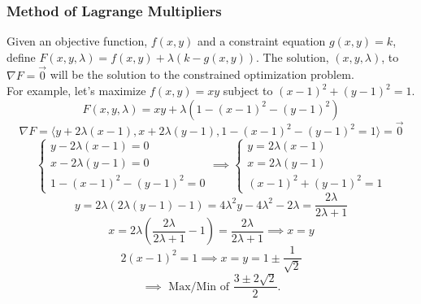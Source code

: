 \subsubsection{Method of Lagrange Multipliers}
\noindent
Given an objective function, $f(x,y)$ and a constraint equation $g(x,y) = k$, define $F(x,y,\lambda) = f(x,y) + \lambda(k-g(x,y))$.
The solution, $(x, y, \lambda)$, to $\nabla F = \vec{0}$ will be the solution to the constrained optimization problem.\\

\noindent
For example, let's maximize $f(x,y)=xy$ subject to $(x-1)^2 + (y-1)^2 = 1$.
\begin{equation*}
	F(x,y,\lambda) = xy + \lambda(1 - (x-1)^2 - (y-1)^2)
\end{equation*}
\begin{equation*}
	\nabla F = \langle y + 2\lambda(x-1), x+2\lambda(y-1), 1 - (x-1)^2 - (y-1)^2 = 1 \rangle = \vec{0}
\end{equation*}
\begin{equation*}
	\begin{cases}
		y - 2\lambda(x-1) = 0 \\ 
		x - 2\lambda(y-1) = 0 \\ 
		1 - (x-1)^2 - (y-1)^2 = 0
	\end{cases}
	\implies \begin{cases}
		y = 2\lambda(x-1) \\ 
		x = 2\lambda(y-1) \\ 
		(x-1)^2 + (y-1)^2 = 1
	\end{cases}
\end{equation*}
\begin{equation*}
	y = 2\lambda(2\lambda(y-1) - 1) = 4\lambda^2 y - 4\lambda^2 - 2\lambda = \frac{2\lambda}{2\lambda+1}
\end{equation*}
\begin{equation*}
	x = 2\lambda\left(\frac{2\lambda}{2\lambda+1} - 1\right) = \frac{2\lambda}{2\lambda+1} \implies x = y
\end{equation*}
\begin{equation*}
	2(x-1)^2 = 1 \implies x = y = 1 \pm \frac{1}{\sqrt{2}}
\end{equation*}
\begin{equation*}
	\implies \text{ Max/Min of } \frac{3 \pm 2\sqrt{2}}{2}.
\end{equation*}